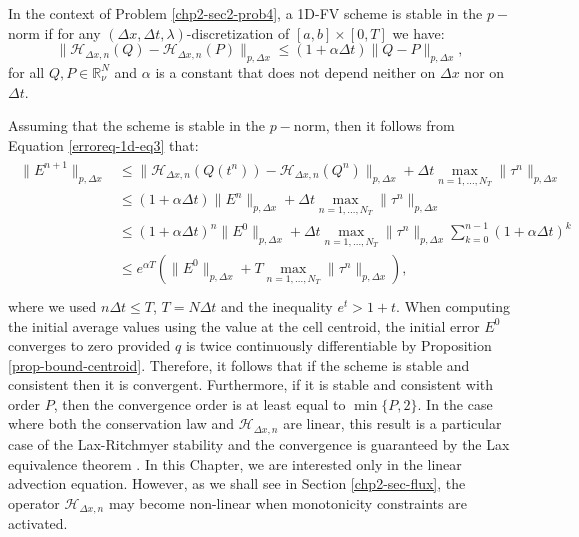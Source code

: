\begin{definition}[Stability]
	In the context of Problem  \ref{chp2-sec2-prob4},
	a 1D-FV scheme is stable in the $p-$norm if for any $(\Delta x, \Delta t, \lambda)$-discretization of $[a,b]\times [0,T]$ we have:
	\begin{equation}
		\|\mathcal{H}_{\Delta x,n}(Q) - \mathcal{H}_{\Delta x,n}(P)\|_{p,\Delta x} \leq (1+\alpha \Delta t)  \|Q-P\|_{p,\Delta x},
	\end{equation}
	for all $Q, P \in \mathbb{R}^{N}_{\nu}$ and $\alpha$ is a constant
	that does not depend neither on $\Delta x$ nor on  $\Delta t$.
\end{definition}
Assuming that the scheme is stable in the $p-$norm, then it follows from Equation \eqref{erroreq-1d-eq3} that:
\begin{align}
	\label{chp2-sec2-erroreq}
	\begin{split}
		\|E^{n+1}\|_{p,\Delta x} 
		&\leq \|\mathcal{H}_{\Delta x,n}(Q(t^n)) - \mathcal{H}_{\Delta x,n}(Q^n)\|_{p,\Delta x} +  \Delta t \max_{n=1, \ldots, N_T}\|\tau^n\|_{p,\Delta x}\\
		&\leq (1+\alpha \Delta t)\|E^n\|_{p,\Delta x} +  \Delta t \max_{n=1, \ldots, N_T}\|\tau^n\|_{p,\Delta x}\\
		&\leq (1+\alpha \Delta t)^n\|E^0\|_{p,\Delta x} +  \Delta t \max_{n=1, \ldots, N_T}\|\tau^n\|_{p,\Delta x}
		\sum_{k=0}^{n-1} (1+\alpha \Delta t)^k\\
		&\leq e^{\alpha T}(\|E^0\|_{p,\Delta x} + T\max_{n=1, \ldots, N_T}\|\tau^n\|_{p,\Delta x}), \\
	\end{split}
\end{align}
where we used $n \Delta t\leq T $, $T=N\Delta t$ and the inequality $e^t> 1+t$.
When computing the initial average values using the value at the cell centroid, 
the initial error $E^0$ converges to zero provided $q$ is twice continuously differentiable
by Proposition \ref{prop-bound-centroid}.
Therefore, it follows that if the scheme is stable and consistent
then it is convergent. 
Furthermore, if it is stable and consistent with order $P$, then
the convergence order is at least equal to $\min\{{P,2}\}$.
In the case where both the conservation law and $\mathcal{H}_{\Delta x,n}$ are linear,
this result is a particular case of the Lax-Ritchmyer stability and the convergence
is guaranteed by the Lax equivalence theorem \citep{leveque:2002}.
In this Chapter, we are interested only in the linear advection equation.
However, as we shall see in Section \ref{chp2-sec-flux}, the operator $\mathcal{H}_{\Delta x,n}$
may become non-linear when monotonicity constraints are activated.

